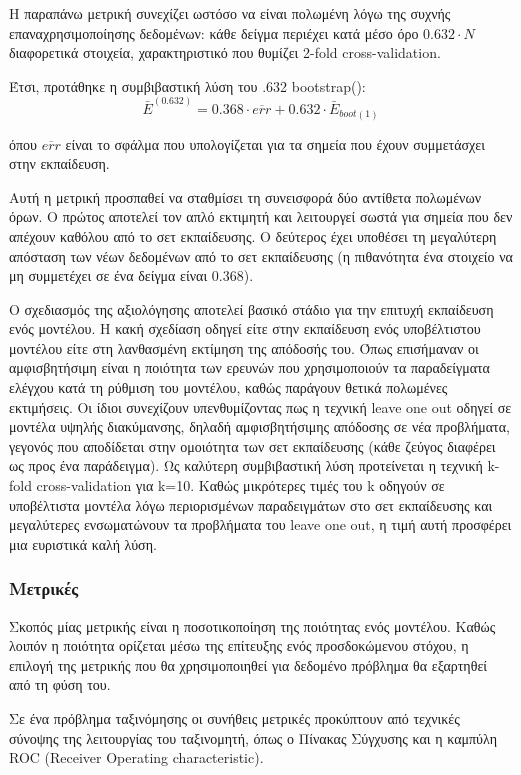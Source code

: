Η παραπάνω μετρική συνεχίζει ωστόσο να είναι πολωμένη λόγω της συχνής επαναχρησιμοποίησης δεδομένων: κάθε δείγμα  περιέχει κατά μέσο όρο $0.632 \cdot N$ διαφορετικά στοιχεία, χαρακτηριστικό που θυμίζει 2-fold cross-validation.

Έτσι, προτάθηκε η συμβιβαστική λύση του .632 bootstrap():
\begin{equation}
\bar{E}^{(0.632)}= 0.368 \cdot \overline{err} + 0.632 \cdot \bar{E}_{boot(1)}
\end{equation}

όπου $\overline{err}$ είναι το σφάλμα που υπολογίζεται για τα σημεία που έχουν συμμετάσχει στην εκπαίδευση.

Αυτή η μετρική προσπαθεί να σταθμίσει τη συνεισφορά δύο αντίθετα πολωμένων όρων. Ο πρώτος αποτελεί τον απλό εκτιμητή και λειτουργεί σωστά για σημεία που δεν απέχουν καθόλου από το σετ εκπαίδευσης. Ο δεύτερος έχει υποθέσει τη μεγαλύτερη απόσταση των νέων δεδομένων από το σετ εκπαίδευσης (η πιθανότητα ένα στοιχείο να μη συμμετέχει σε ένα δείγμα είναι $0.368$).

Ο σχεδιασμός της αξιολόγησης αποτελεί βασικό στάδιο για την επιτυχή εκπαίδευση ενός μοντέλου. Η κακή σχεδίαση οδηγεί είτε στην εκπαίδευση ενός υπο\-βέλτιστου μοντέλου είτε στη λανθασμένη εκτίμηση της απόδοσής του. Όπως επισήμαναν οι \citet{10.2307/3058705} αμφισβητήσιμη είναι η ποιότητα των ερευνών που χρησιμοποιούν τα παραδείγματα ελέγχου κατά τη ρύθμιση του μοντέλου, καθώς παράγουν θετικά πολωμένες εκτιμήσεις. Οι ίδιοι συνεχίζουν υπενθυμίζοντας πως η τεχνική leave one out οδηγεί σε μοντέλα υψηλής διακύμανσης, δηλαδή αμφισβητήσιμης απόδοσης σε νέα προβλήματα, γεγονός που αποδίδεται στην ομοιότητα των σετ εκπαίδευσης (κάθε ζεύγος διαφέρει ως προς ένα παράδειγμα). Ως καλύτερη συμβιβαστική λύση προτείνεται η τεχνική k-fold cross-validation για k=10. Καθώς μικρότερες τιμές του k οδηγούν σε υποβέλτιστα μοντέλα λόγω περιορισμένων παραδειγμάτων στο σετ εκπαίδευσης και μεγαλύτερες ενσωματώνουν τα προβλήματα του leave one out, η τιμή αυτή προσφέρει μια ευριστικά καλή λύση. 
\subsubsection{Μετρικές} Σκοπός μίας μετρικής είναι η ποσοτικοποίηση της ποιότητας ενός μοντέλου. Καθώς λοιπόν η ποιότητα ορίζεται μέσω της επίτευξης ενός προσδοκώμενου στόχου, η επιλογή της μετρικής που θα χρησιμοποιηθεί για δεδομένο πρόβλημα θα εξαρτηθεί από τη φύση του.

Σε ένα πρόβλημα ταξινόμησης οι συνήθεις μετρικές προκύπτουν από τεχνικές σύνοψης της λειτουργίας του ταξινομητή, όπως ο Πίνακας Σύγχυσης και η καμπύλη ROC (Receiver Operating characteristic).

